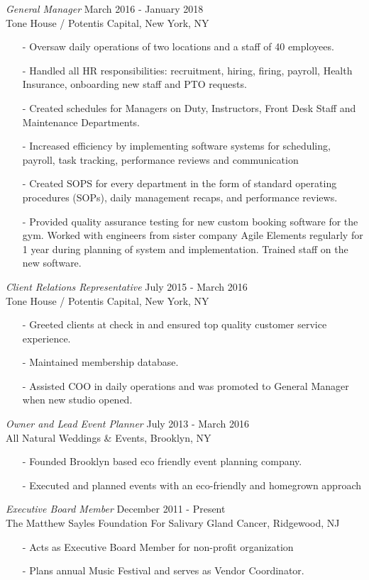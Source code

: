 \documentclass{res} %
\begin{document}
\begin{resume}
{\sl General Manager} \hfill March 2016 - January 2018\\
Tone House / Potentis Capital, New York, NY
\begin{itemize}
\item[-] Oversaw daily operations of two locations and a staff of 40 employees.
\item[-] Handled all HR responsibilities: recruitment, hiring, firing, payroll, Health Insurance, onboarding new staff and PTO requests.
\item[-] Created schedules for Managers on Duty, Instructors, Front Desk Staff and Maintenance Departments.
\item[-] Increased efficiency by implementing software systems for scheduling, payroll, task tracking, performance reviews and communication
\item[-] Created SOPS for every department in the form of standard operating procedures (SOPs), daily management recaps, and performance reviews. 
\item[-] Provided quality assurance testing for new custom booking software for the gym. Worked with engineers from sister company Agile Elements regularly for 1 year during planning of system and implementation. Trained staff on the new software.
\end{itemize}

{\sl Client Relations Representative} \hfill July 2015 - March 2016\\
Tone House / Potentis Capital, New York, NY
\begin{itemize}
\item[-] Greeted clients at check in and ensured top quality customer service experience. 
\item[-] Maintained membership database.
\item[-] Assisted COO in daily operations and was promoted to General Manager when new studio opened.
\end{itemize}
 
{\sl Owner and Lead Event Planner} \hfill July 2013 - March 2016\\
All Natural Weddings \& Events, Brooklyn, NY
\begin{itemize}
\item[-] Founded Brooklyn based eco friendly event planning company.
\item[-] Executed and planned events with an eco-friendly and homegrown approach
\end{itemize}

{\sl Executive Board Member} \hfill December 2011 - Present\\
The Matthew Sayles Foundation For Salivary Gland Cancer, Ridgewood, NJ
\begin{itemize}
\item[-] Acts as Executive Board Member for non-profit organization
\item[-] Plans annual Music Festival and serves as Vendor Coordinator.
\end{itemize}


\end{resume}
\end{document}
